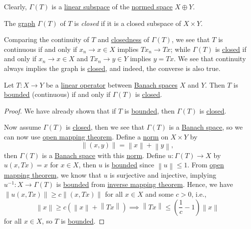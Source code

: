 Clearly, \(\Gamma (T)\) is a \hyperref[def:linear-vector-space]{linear subspace} of the \hyperref[def:normed-vector-space]{normed space} \(X\oplus Y\).

\begin{definition}\label{def:closed-graph}
	The \hyperref[def:graph]{graph} \(\Gamma (T)\) of \(T\) is \emph{closed} if it is a closed subspace of \(X \times Y\).
\end{definition}

Comparing the continuity of \(T\) and \hyperref[def:closed-graph]{closedness} of \(\Gamma (T)\), we see that \(T\) is continuous if and only if \(x_n \to x\in X\) implies \(Tx_n \to Tx\); while \(\Gamma (T)\) is \hyperref[def:closed-graph]{closed} if and only if \(x_n \to x\in X\) and \(Tx_n \to y\in Y\) implies \(y = Tx\). We see that continuity always implies the graph is \hyperref[def:closed-graph]{closed}, and indeed, the converse is also true.

\begin{theorem}\label{thm:closed-graph}
	Let \(T\colon X\to Y\) be a \hyperref[def:linear-op]{linear operator} between \hyperref[def:Banach-space]{Banach spaces} \(X\) and \(Y\). Then \(T\) is \hyperref[def:bounded-linear-op]{bounded} (continuous) if and only if \(\Gamma (T)\) is \hyperref[def:closed-graph]{closed}.
\end{theorem}
\begin{proof}
	We have already shown that if \(T\) is \hyperref[def:bounded-linear-op]{bounded}, then \(\Gamma (T)\) is \hyperref[def:closed-graph]{closed}.

	Now assume \(\Gamma (T)\) is \hyperref[def:closed-graph]{closed}, then we see that \(\Gamma (T)\) is a \hyperref[def:Banach-space]{Banach space}, so we can now use \hyperref[thm:open-mapping]{open mapping theorem}. Define a \hyperref[def:norm]{norm} on \(X \times Y\) by
	\[
		\left\lVert (x, y)\right\rVert = \left\lVert x\right\rVert + \left\lVert y\right\rVert,
	\]
	then \(\Gamma (T)\) is a \hyperref[def:Banach-space]{Banach space} with this \hyperref[def:norm]{norm}. Define \(u\colon \Gamma (T)\to X\) by \(u(x, Tx)=x\) for \(x\in X\), then \(u\) is \hyperref[rmk:bounded-op]{bounded} since \(\left\lVert u\right\rVert \leq 1\). From \hyperref[thm:open-mapping]{open mapping theorem}, we know that \(u\) is surjective and injective, implying \(u^{-1} \colon X\to \Gamma (T)\) is \hyperref[rmk:bounded-op]{bounded} from \hyperref[thm:inverse-mapping]{inverse mapping theorem}. Hence, we have \(\left\lVert u(x, Tx)\right\rVert \geq c \left\lVert (x, Tx)\right\rVert\) for all \(x\in X\) and some \(c> 0\), i.e.,
	\[
		\left\lVert x\right\rVert \geq c \left( \left\lVert x\right\rVert + \left\lVert Tx\right\rVert  \right) \implies \left\lVert Tx\right\rVert \leq \left( \frac{1}{c}- 1 \right) \left\lVert x\right\rVert
	\]
	for all \(x\in X\), so \(T\) is \hyperref[rmk:bounded-op]{bounded}.
\end{proof}

